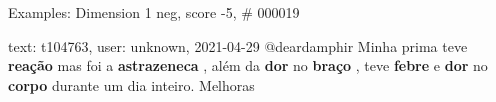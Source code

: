 \begin{frame}{Examples: Dimension 1 neg, score -5, \# 000019}
\footnotesize
\begin{alertblock}{text: t104763, user: unknown, 2021-04-29}
@deardamphir Minha prima teve \textbf{reação} mas foi a \textbf{astrazeneca} , 
além da \textbf{dor} no \textbf{braço} , teve \textbf{febre} e \textbf{dor} no 
\textbf{corpo} durante um dia inteiro. Melhoras  
\end{alertblock}
\end{frame}
